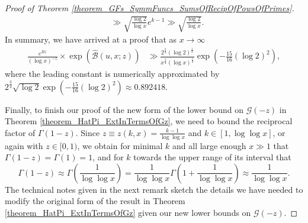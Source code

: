 \documentclass[11pt,reqno,a4letter]{article}
\numberwithin{figure}{section}
\numberwithin{table}{section}
\theoremstyle{plain}
\numberwithin{theorem}{section}
\theoremstyle{definition}
\begin{document}
\begin{proof}[Proof of Theorem \ref{theorem_GFs_SymmFuncs_SumsOfRecipOfPowsOfPrimes}]
\begin{align*}
     & \gg 
     \sqrt{\frac{\log 2}{\log x}} e^{k-1} \gg 
     \sqrt{\frac{\log 2}{\log x}}. 
\end{align*} 
In summary, we have arrived at a proof that 
as $x \rightarrow \infty$
\begin{align} 
\label{eqn_proof_tag_simpl_v1} 
\frac{e^{Bz}}{(\log x)^{-z}} \times \exp\left(\widehat{\mathcal{B}}(u, x; z)\right) & \gg 
     \frac{2^{\frac{3}{4}} (\log 2)^{\frac{1}{2}}}{x^{\frac{3}{4}} (\log x)^{\frac{1}{2}}} 
     \exp\left(-\frac{15}{16} (\log 2)^2\right), 
\end{align} 
where the leading constant is numerically approximated by 
$2^{\frac{3}{4}} \sqrt{\log 2} \exp\left(-\frac{15}{16} (\log 2)^2\right) \approx 0.892418$. 

Finally, to finish our proof of the new form of the lower bound on $\mathcal{G}(-z)$ in 
Theorem \ref{theorem_HatPi_ExtInTermsOfGz}, 
we need to bound the reciprocal factor of $\Gamma(1-z)$. 
Since $z \equiv z(k, x) = \frac{k-1}{\log\log x}$ and 
$k \in [1, \log\log x]$, or again with $z \in [0, 1)$, 
we obtain for minimal $k$ and all large enough $x \gg 1$ that 
$\Gamma(1-z) = \Gamma(1) = 1$, and for $k$ towards the upper range of 
its interval that 
\[
\Gamma(1-z) \approx \Gamma\left(\frac{1}{\log\log x}\right) = 
     \frac{1}{\log\log x} \Gamma\left(1 + \frac{1}{\log\log x}\right) 
     \approx \frac{1}{\log\log x}. 
\]
The technical notes given in the next remark sketch the details we have needed to 
modify the original form of the result in 
Theorem \ref{theorem_HatPi_ExtInTermsOfGz} given our new lower bounds on 
$\mathcal{G}(-z)$. 
\end{proof} 
\end{document}
